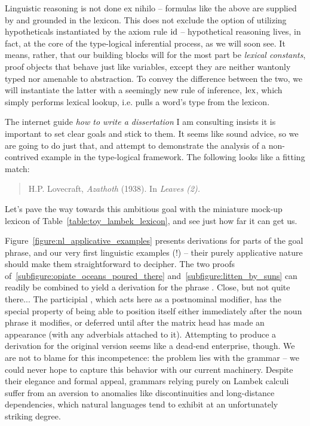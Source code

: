 Linguistic reasoning is not done ex nihilo -- formulas like the above are supplied by and grounded in the lexicon. 
This does not exclude the option of utilizing hypotheticals instantiated by the axiom rule $\mathrm{id}$ -- hypothetical reasoning lives, in fact, at the core of the type-logical inferential process, as we will soon see.
It means, rather, that our building blocks will for the most part be \textit{lexical constants}, proof objects that behave just like variables, except they are neither wantonly typed nor amenable to abstraction.
To convey the difference between the two, we will instantiate the latter with a seemingly new rule of inference, $\mathrm{lex}$, which simply performs lexical lookup, i.e. pulls a word's type from the lexicon.

The internet guide \textit{how to write a dissertation} I am consulting insists it is important to set clear goals and stick to them.
It seems like sound advice, so we are going to do just that, and attempt to demonstrate the analysis of a non-contrived example in the type-logical framework.
The following looks like a fitting match:
\begin{quote}
\begin{flushright} H.P. Lovecraft, \textit{Azathoth}  (1938). In \textit{Leaves (2).}\end{flushright}
\end{quote}
Let's pave the way towards this ambitious goal with the miniature mock-up lexicon of Table~\ref{table:toy_lambek_lexicon}, and see just how far it can get us.

Figure~\ref{figure:nl_applicative_examples} presents derivations for parts of the goal phrase, and our very first linguistic examples (!) -- their purely applicative nature should make them straightforward to decipher.
The two proofs of~\ref{subfigure:opiate_oceans_poured_there} and~\ref{subfigure:litten_by_suns} can readily be combined to yield a derivation for the phrase . 
Close, but not quite there...
The participial , which acts here as a postnominal modifier, has the special property of being able to position itself either immediately after the noun phrase  it modifies, or deferred until after the matrix head  has made an appearance (with any adverbials attached to it).
Attempting to produce a derivation for the original version seems like a dead-end enterprise, though.
We are not to blame for this incompetence: the problem lies with the grammar -- we could never hope to capture this behavior with our current machinery.
Despite their elegance and formal appeal, grammars relying purely on Lambek calculi suffer from an aversion to anomalies like discontinuities and long-distance dependencies, which natural languages tend to exhibit at an unfortunately striking degree.

